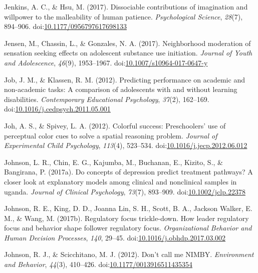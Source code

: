 \documentclass[english,man]{apa6}
\theoremstyle{definition}
\theoremstyle{definition}
\theoremstyle{definition}
\theoremstyle{remark}
\begin{document}
\hypertarget{ref-Jenkins2017}{}
Jenkins, A. C., \& Hsu, M. (2017). Dissociable contributions of
imagination and willpower to the malleability of human patience.
\emph{Psychological Science}, \emph{28}(7), 894--906.
doi:\href{https://doi.org/10.1177/0956797617698133}{10.1177/0956797617698133}

\hypertarget{ref-Jensen2017}{}
Jensen, M., Chassin, L., \& Gonzales, N. A. (2017). Neighborhood
moderation of sensation seeking effects on adolescent substance use
initiation. \emph{Journal of Youth and Adolescence}, \emph{46}(9),
1953--1967.
doi:\href{https://doi.org/10.1007/s10964-017-0647-y}{10.1007/s10964-017-0647-y}

\hypertarget{ref-Job2012}{}
Job, J. M., \& Klassen, R. M. (2012). Predicting performance on academic
and non-academic tasks: A comparison of adolescents with and without
learning disabilities. \emph{Contemporary Educational Psychology},
\emph{37}(2), 162--169.
doi:\href{https://doi.org/10.1016/j.cedpsych.2011.05.001}{10.1016/j.cedpsych.2011.05.001}

\hypertarget{ref-Joh2012}{}
Joh, A. S., \& Spivey, L. A. (2012). Colorful success: Preschoolers' use
of perceptual color cues to solve a spatial reasoning problem.
\emph{Journal of Experimental Child Psychology}, \emph{113}(4),
523--534.
doi:\href{https://doi.org/10.1016/j.jecp.2012.06.012}{10.1016/j.jecp.2012.06.012}

\hypertarget{ref-Johnson2017}{}
Johnson, L. R., Chin, E. G., Kajumba, M., Buchanan, E., Kizito, S., \&
Bangirana, P. (2017a). Do concepts of depression predict treatment
pathways? A closer look at explanatory models among clinical and
nonclinical samples in uganda. \emph{Journal of Clinical Psychology},
\emph{73}(7), 893--909.
doi:\href{https://doi.org/10.1002/jclp.22378}{10.1002/jclp.22378}

\hypertarget{ref-Johnson2017a}{}
Johnson, R. E., King, D. D., Joanna Lin, S. H., Scott, B. A., Jackson
Walker, E. M., \& Wang, M. (2017b). Regulatory focus trickle-down. How
leader regulatory focus and behavior shape follower regulatory focus.
\emph{Organizational Behavior and Human Decision Processes}, \emph{140},
29--45.
doi:\href{https://doi.org/10.1016/j.obhdp.2017.03.002}{10.1016/j.obhdp.2017.03.002}

\hypertarget{ref-Johnson2012}{}
Johnson, R. J., \& Scicchitano, M. J. (2012). Don't call me NIMBY.
\emph{Environment and Behavior}, \emph{44}(3), 410--426.
doi:\href{https://doi.org/10.1177/0013916511435354}{10.1177/0013916511435354}
\end{document}
